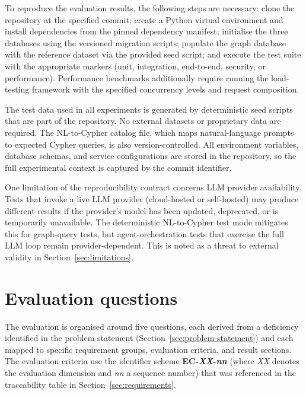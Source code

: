 \documentclass[a4paper]{sapthesis}
\begin{document}
To reproduce the evaluation results, the following steps are necessary:
clone the repository at the specified commit; create a Python virtual
environment and install dependencies from the pinned dependency manifest;
initialise the three databases using the versioned migration scripts;
populate the graph database with the reference dataset via the provided
seed script; and execute the test suite with the appropriate markers
(unit, integration, end-to-end, security, or performance).  Performance
benchmarks additionally require running the load-testing framework with
the specified concurrency levels and request composition.

The test data used in all experiments is generated by deterministic seed
scripts that are part of the repository.  No external datasets or
proprietary data are required.  The NL-to-Cypher catalog file, which
maps natural-language prompts to expected Cypher queries, is also
version-controlled.  All environment variables, database schemas, and
service configurations are stored in the repository, so the full
experimental context is captured by the commit identifier.

One limitation of the reproducibility contract concerns LLM provider
availability.  Tests that invoke a live LLM provider (cloud-hosted or
self-hosted) may produce different results if the provider's model has
been updated, deprecated, or is temporarily unavailable.  The
deterministic NL-to-Cypher test mode mitigates this for graph-query tests,
but agent-orchestration tests that exercise the full LLM loop remain
provider-dependent.  This is noted as a threat to external validity in
Section~\ref{sec:limitations}.


\section{Evaluation questions}
\label{sec:evaluation-questions}

The evaluation is organised around five questions, each derived from a
deficiency identified in the problem statement
(Section~\ref{sec:problem-statement}) and each mapped to specific
requirement groups, evaluation criteria, and result sections.  The
evaluation criteria use the identifier scheme
\textbf{EC-\emph{XX}-\emph{nn}} (where \emph{XX} denotes the evaluation
dimension and \emph{nn} a sequence number) that was referenced in the
traceability table in Section~\ref{sec:requirements}.
\end{document}
